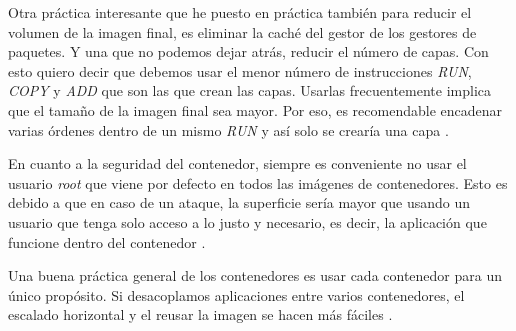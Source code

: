 Otra práctica interesante que he puesto en práctica también para reducir el volumen de la imagen final, es eliminar la caché del gestor de los gestores de paquetes. Y una que no podemos dejar atrás, reducir el número de capas. Con esto quiero decir que debemos usar el menor número de instrucciones \textit{RUN}, \textit{COPY} y \textit{ADD} que son las que crean las capas. Usarlas frecuentemente implica que el tamaño de la imagen final sea mayor. Por eso, es recomendable encadenar varias órdenes dentro de un mismo \textit{RUN} y así solo se crearía una capa \cite{dockerbestpractices}.\newline

En cuanto a la seguridad del contenedor, siempre es conveniente no usar el usuario \textit{root} que viene por defecto en todos las imágenes de contenedores. Esto es debido a que en caso de un ataque, la superficie sería mayor que usando un usuario que tenga solo acceso a lo justo y necesario, es decir, la aplicación que funcione dentro del contenedor \cite{dockerbestpracticesdev}.\newline

Una buena práctica general de los contenedores es usar cada contenedor para un único propósito. Si desacoplamos aplicaciones entre varios contenedores, el escalado horizontal y el reusar la imagen se hacen más fáciles \cite{dockerbestpractices}.
